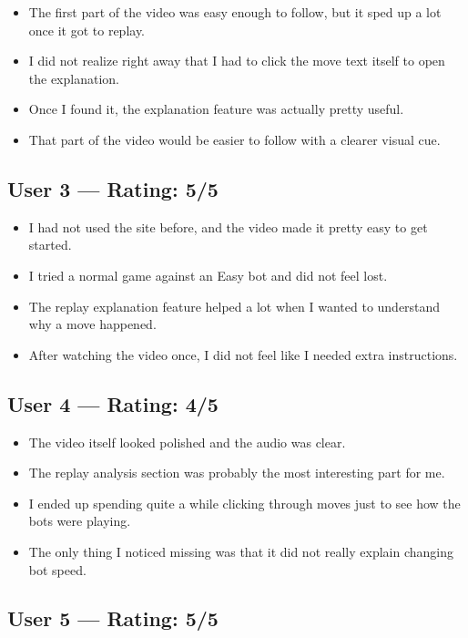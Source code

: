 \documentclass{article}
\begin{document}
\begin{itemize}
    \item The first part of the video was easy enough to follow, but it sped up a lot once it got to replay.
    \item I did not realize right away that I had to click the move text itself to open the explanation.
    \item Once I found it, the explanation feature was actually pretty useful.
    \item That part of the video would be easier to follow with a clearer visual cue.
\end{itemize}

\subsection{User 3 --- Rating: 5/5}

\begin{itemize}
    \item I had not used the site before, and the video made it pretty easy to get started.
    \item I tried a normal game against an Easy bot and did not feel lost.
    \item The replay explanation feature helped a lot when I wanted to understand why a move happened.
    \item After watching the video once, I did not feel like I needed extra instructions.
\end{itemize}

\subsection{User 4 --- Rating: 4/5}

\begin{itemize}
    \item The video itself looked polished and the audio was clear.
    \item The replay analysis section was probably the most interesting part for me.
    \item I ended up spending quite a while clicking through moves just to see how the bots were playing.
    \item The only thing I noticed missing was that it did not really explain changing bot speed.
\end{itemize}

\subsection{User 5 --- Rating: 5/5}
\end{document}
